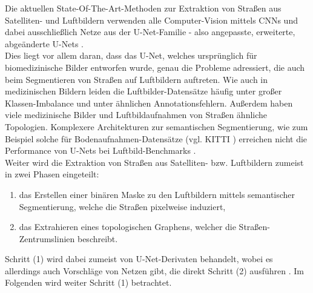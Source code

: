 Die aktuellen State-Of-The-Art-Methoden zur Extraktion von Straßen aus Satelliten- und Luftbildern verwenden 
alle Computer-Vision mittels \acp{CNN} und dabei ausschließlich Netze aus der U-Net-Familie - also angepasste, 
erweiterte, abgeänderte U-Nets \cites{C.Henry.2021, Constantin.2018, Kamiya.2018, Yerram.2022}. \\
Dies liegt vor allem daran, dass das U-Net, welches ursprünglich für biomedizinische Bilder entworfen wurde, 
genau die Probleme adressiert, die auch beim Segmentieren von Straßen auf Luftbildern auftreten. 
Wie auch in medizinischen Bildern leiden die Luftbilder-Datensätze häufig unter großer Klassen-Imbalance 
und unter ähnlichen Annotationsfehlern. Außerdem haben viele medizinische Bilder und Luftbildaufnahmen von Straßen 
ähnliche Topologien. Komplexere Architekturen zur semantischen Segmentierung, wie zum Beispiel solche 
für Bodenaufnahmen-Datensätze (vgl. KITTI \cite{Geiger.2013}) erreichen nicht die Performance von U-Nets bei 
Luftbild-Benchmarks \cite{C.Henry.2021}. \\
Weiter wird die Extraktion von Straßen aus Satelliten- bzw. Luftbildern zumeist in zwei Phasen eingeteilt: 
\begin{enumerate}
	\item das Erstellen einer binären Maske zu den Luftbildern mittels semantischer Segmentierung, 
	welche die Straßen pixelweise induziert, 
	\item das Extrahieren eines topologischen Graphens, welcher die Straßen-Zentrumslinien beschreibt.   
\end{enumerate}
Schritt (1) wird dabei zumeist von U-Net-Derivaten behandelt, wobei es allerdings auch Vorschläge von Netzen gibt, 
die direkt Schritt (2) ausführen \cite{C.Henry.2021}.
Im Folgenden wird weiter Schritt (1) betrachtet.   

